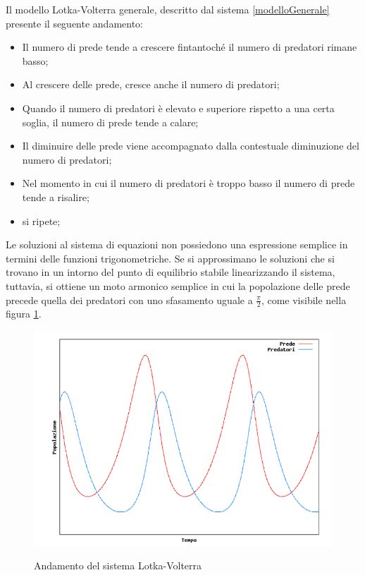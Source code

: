 \documentclass[11pt]{article}
\begin{document}
Il modello Lotka-Volterra generale, descritto dal sistema \ref{modelloGenerale} presente il seguente andamento: 
\begin{itemize}
    \item Il numero di prede tende a crescere fintantoché il numero di predatori rimane basso;
    \item Al crescere delle prede, cresce anche il numero di predatori;
    \item Quando il numero di predatori è elevato e superiore rispetto a una certa soglia, il numero di prede tende a calare;
    \item Il diminuire delle prede viene accompagnato dalla contestuale diminuzione del numero di predatori;
    \item Nel momento in cui il numero di predatori è troppo basso il numero di prede tende a risalire;
    \item si ripete;
\end{itemize}

Le soluzioni al sistema di equazioni non possiedono una espressione semplice in termini delle funzioni trigonometriche. Se si approssimano le soluzioni che si trovano in un intorno del punto di equilibrio stabile linearizzando il sistema, tuttavia, si ottiene un moto armonico semplice in cui la popolazione delle prede precede quella dei predatori con uno sfasamento uguale a $\frac{\pi}{2}$, come visibile nella figura \ref{fig:AndamentoLotkaVolterra}\cite{WikiLotkaVolterra}.

\begin{figure}[h]
    \centering
    \includegraphics[scale = 0.7]{risultatoLotkaVolterra.PNG}
    \label{fig:AndamentoLotkaVolterra}
    \caption{Andamento del sistema Lotka-Volterra}
\end{figure}
\end{document}
